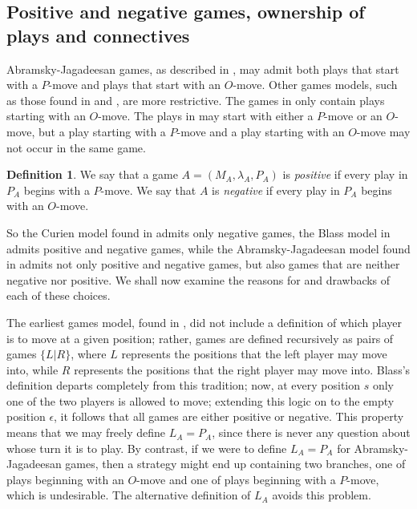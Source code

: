 \documentclass[11pt]{article} %
\theoremstyle{plain} %
\theoremstyle{definition} %
\newtheorem{definition}[theorem]{Definition}
\theoremstyle{note}
\theoremstyle{exercisestyle}
\newcommand{\emptyplay}{\epsilon}
\begin{document}
\subsection{Positive and negative games, ownership of plays and connectives}

Abramsky-Jagadeesan games, as described in \cite{abramskyjagadeesangames}, may admit both plays that start with a $P$-move and plays that start with an $O$-move.  Other games models, such as those found in \cite{blassgames} and \cite{curiengames}, are more restrictive.  The games in \cite{curiengames} only contain plays starting with an $O$-move.  The plays in \cite{blassgames} may start with either a $P$-move or an $O$-move, but a play starting with a $P$-move and a play starting with an $O$-move may not occur in the same game.

\begin{definition}
  We say that a game $A=(M_A,\lambda_A,P_A)$ is \emph{positive} if every play in $P_A$ begins with a $P$-move.
  We say that $A$ is \emph{negative} if every play in $P_A$ begins with an $O$-move.
\end{definition}

So the Curien model found in \cite{curiengames} admits only negative games, the Blass model in \cite{blassgames} admits positive and negative games, while the Abramsky-Jagadeesan model found in \cite{abramskyjagadeesangames} admits not only positive and negative games, but also games that are neither negative nor positive.  We shall now examine the reasons for and drawbacks of each of these choices.

The earliest games model, found in \cite{conwaygames}, did not include a definition of which player is to move at a given position; rather, games are defined recursively as pairs of games $\{L|R\}$, where $L$ represents the positions that the left player may move into, while $R$ represents the positions that the right player may move into.  Blass's definition departs completely from this tradition; now, at every position $s$ only one of the two players is allowed to move; extending this logic on to the empty position $\emptyplay$, it follows that all games are either positive or negative.  This property means that we may freely define $L_A=P_A$, since there is never any question about whose turn it is to play.  By contrast, if we were to define $L_A=P_A$ for Abramsky-Jagadeesan games, then a strategy might end up containing two branches, one of plays beginning with an $O$-move and one of plays beginning with a $P$-move, which is undesirable.  The alternative definition of $L_A$ avoids this problem.
\end{document}
